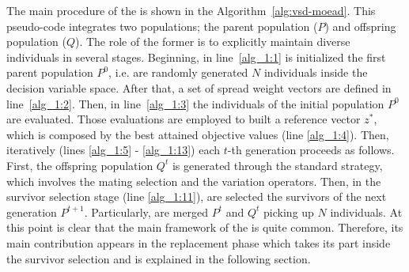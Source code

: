 The main procedure of the \VSDMOEAD{} is shown in the Algorithm~\ref{alg:vsd-moead}.
%
This pseudo-code integrates two populations; the parent population ($P$) and offspring population ($Q$).
%
The role of the former is to explicitly maintain diverse individuals in several stages.
%
Beginning, in line~\ref{alg_1:1} is initialized the first parent population $P^0$, i.e. are randomly generated $N$ individuals inside the decision variable space.
%
After that, a set of spread weight vectors are defined in line~\ref{alg_1:2}.
%
Then, in line~\ref{alg_1:3} the individuals of the initial population $P^0$ are evaluated.
%
Those evaluations are employed to built a reference vector $z^*$, which is composed by the best attained objective values (line \ref{alg_1:4}).
%
Then, iteratively (lines \ref{alg_1:5} - \ref{alg_1:13}) each $t$-th generation proceeds as follows.
%
First, the offspring population $Q^t$ is generated through the standard \DE{} strategy, which involves the mating selection and the variation operators.
%
Then, in the survivor selection stage (line \ref{alg_1:11}), are selected the survivors of the next generation $P^{t+1}$.
%
Particularly, are merged $P^t$ and $Q^t$ picking up $N$ individuals.
%
At this point is clear that the main framework of the \VSDMOEAD{} is quite common.
%
Therefore, its main contribution appears in the replacement phase which takes its part inside the survivor selection and is explained in the following section.
%

